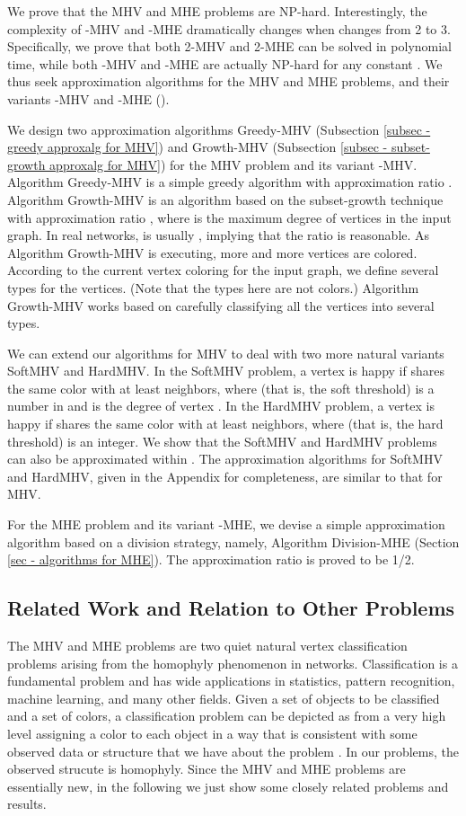 \documentclass[11pt]{article}
\begin{document}
We prove that the MHV and MHE problems are NP-hard. Interestingly, the
complexity of -MHV and -MHE dramatically changes when  changes
from 2 to 3. Specifically, we prove that both 2-MHV and 2-MHE can be solved
in polynomial time, while both -MHV and -MHE are actually NP-hard for
any constant . We thus seek approximation algorithms for the MHV
and MHE problems, and their variants -MHV and -MHE ().

We design two approximation algorithms
{\sc Greedy-MHV} (Subsection \ref{subsec - greedy approxalg for MHV}) and
{\sc Growth-MHV} (Subsection \ref{subsec - subset-growth approxalg for MHV})
for the MHV problem and its variant -MHV.
Algorithm {\sc Greedy-MHV} is a simple greedy algorithm with approximation
ratio . Algorithm {\sc Growth-MHV} is an algorithm based on the
subset-growth technique with approximation ratio ,
where  is the maximum degree of vertices in the input graph.
In real networks,  is usually , implying that
the ratio  is reasonable.
As Algorithm {\sc Growth-MHV} is executing, more and more vertices are
colored. According to the current vertex coloring for the input graph,
we define several types for the vertices. (Note that the types here are not
colors.) Algorithm {\sc Growth-MHV} works based on carefully classifying
all the vertices into several types.

We can extend our algorithms for MHV to deal with two more natural variants
SoftMHV and HardMHV.
In the SoftMHV problem, a vertex  is happy if  shares the same color with
at least  neighbors, where  (that is, the soft threshold)
is a number in  and  is the degree of vertex .
In the HardMHV problem, a vertex  is happy if  shares the same color with
at least  neighbors, where  (that is, the hard threshold) is an integer.
We show that the SoftMHV and HardMHV problems can also be approximated within
.
The approximation algorithms for SoftMHV and HardMHV, given in the Appendix
for completeness, are similar to that for MHV.

For the MHE problem and its variant -MHE, we devise a simple
approximation algorithm based on a division strategy, namely,
Algorithm {\sc Division-MHE} (Section \ref{sec - algorithms for MHE}).
The approximation ratio is proved to be 1/2.




\subsection{Related Work and Relation to Other Problems}
\label{sec - related works}
The MHV and MHE problems are two quiet natural vertex classification problems
arising from the homophyly phenomenon in networks.
Classification is a fundamental problem and has wide applications in
statistics, pattern recognition, machine learning, and many other fields.
Given a set of objects to be classified and a set of colors, a classification
problem can be depicted as from a very high level assigning a color to
each object in a way that is consistent with some observed data or structure
that we have about the problem \cite{BFOS84,KT02}.
In our problems, the observed strucute is homophyly.
Since the MHV and MHE problems are essentially new, in the following we just
show some closely related problems and results.
\end{document}
